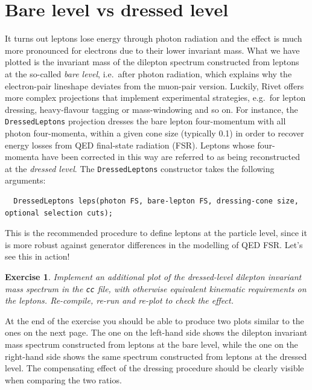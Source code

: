 \documentclass[10pt,fleqn]{scrartcl}
\theoremstyle{exstyle}
\newtheorem{exercise}{Exercise}
\begin{document}
\section{Bare level vs dressed level}

It turns out leptons lose energy through photon radiation and the effect is much more pronounced
for electrons due to their lower invariant mass. What we have plotted is the invariant mass of
the dilepton spectrum constructed from leptons at the so-called \emph{bare level}, i.e.\
after photon radiation, which explains why the electron-pair lineshape deviates from the muon-pair version.
Luckily, Rivet offers more complex projections that implement experimental strategies, e.g.\ for
lepton dressing, heavy-flavour tagging or mass-windowing and so on.
For instance, the \verb|DressedLeptons| projection dresses the bare lepton four-momentum 
with all photon four-momenta, within a given cone size (typically 0.1) in order to recover 
energy losses from QED final-state radiation (FSR). Leptons whose four-momenta have been
corrected in this way are referred to as being reconstructed at the \emph{dressed level}.
The \verb|DressedLeptons| constructor 
takes the following arguments:
\begin{small}
\begin{verbatim}
  DressedLeptons leps(photon FS, bare-lepton FS, dressing-cone size, optional selection cuts);
\end{verbatim}
\end{small}
This is the recommended procedure to define leptons at the particle level, 
since it is more robust against generator differences in the modelling of QED FSR.
Let's see this in action!

\begin{exercise}
Implement an \emph{additional} plot of the dressed-level dilepton invariant mass
spectrum in the \verb|cc| file, with otherwise equivalent kinematic requirements
on the leptons. Re-compile, re-run and re-plot to check the effect.
\end{exercise}

At the end of the exercise you should be able to produce two plots similar to
the ones on the next page. The one on the left-hand side shows the dilepton
invariant mass spectrum constructed from leptons at the bare level, while 
the one on the right-hand side shows the same spectrum constructed from
leptons at the dressed level. The compensating effect of the dressing
procedure should be clearly visible when comparing the two ratios.
\end{document}
